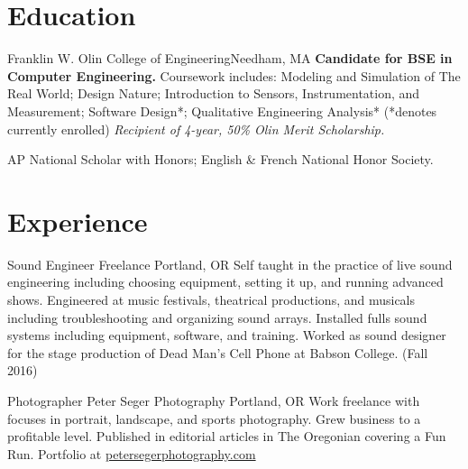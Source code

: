 \documentclass[11.5pt]{moderncv}
\begin{document}
\maketitle

\vspace{-.3in}

\section{Education}

{Franklin W. Olin College of Engineering}{}{Needham, MA}{}
{
	\textbf{Candidate for BSE in Computer Engineering.}
	  Coursework includes:
    Modeling and Simulation of The Real World;
    Design Nature;
    Introduction to Sensors, Instrumentation, and Measurement;
    Software Design*;
    Qualitative Engineering Analysis*
       (*denotes currently enrolled)
	\newline
	\textit{Recipient of 4-year, 50\% Olin Merit Scholarship.}
}

{
	AP National Scholar with Honors; English \& French National Honor Society.
	\begin{flushright}
	\vspace {-0.3 in}
	\end{flushright}
	\vspace {-0.1 in}
}

\section{Experience}
\vspace{0.05 in}

{Sound Engineer}
{Freelance}
{Portland, OR}
{}
{Self taught in the practice of live sound engineering including choosing equipment, setting it up, and running advanced shows. Engineered at music festivals, theatrical productions, and musicals including troubleshooting and organizing sound arrays. Installed fulls sound systems including equipment, software, and training. Worked as sound designer for the stage production of Dead Man's Cell Phone at Babson College. (Fall 2016)}

{Photographer}
{Peter Seger Photography}
{Portland, OR}
{}
{Work freelance with focuses in portrait, landscape, and sports photography. Grew business to a profitable level.
 Published in editorial articles in The Oregonian covering a Fun Run. Portfolio at \href{www.petersegerphotography.com}{petersegerphotography.com}}
\end{document}
